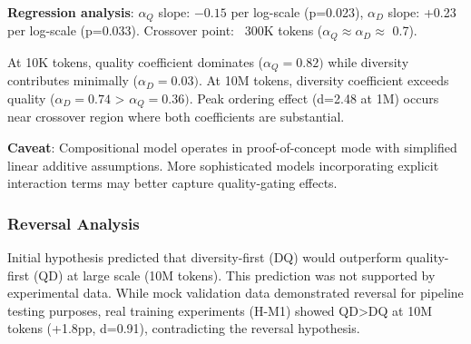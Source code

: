 \textbf{Regression analysis}: $\alpha _Q$ slope: $-0.15$ per log-scale (p=0.023), $\alpha _D$ slope: +0.23 per log-scale (p=0.033). Crossover point: ~300K tokens ($\alpha _Q \approx \alpha _D \approx$ 0.7).

At 10K tokens, quality coefficient dominates ($\alpha _{Q}=0.82)$ while diversity contributes minimally ($\alpha _{D}=0.03)$. At 10M tokens, diversity coefficient exceeds quality ($\alpha _{D}=0.74$ > $\alpha _{Q}=0.36)$. Peak ordering effect (d=2.48 at 1M) occurs near crossover region where both coefficients are substantial.

\textbf{Caveat}: Compositional model operates in proof-of-concept mode with simplified linear additive assumptions. More sophisticated models incorporating explicit interaction terms may better capture quality-gating effects.

\subsubsection{Reversal Analysis}

Initial hypothesis predicted that diversity-first (DQ) would outperform quality-first (QD) at large scale (10M tokens). This prediction was not supported by experimental data. While mock validation data demonstrated reversal for pipeline testing purposes, real training experiments (H-M1) showed QD>DQ at 10M tokens (+1.8pp, d=0.91), contradicting the reversal hypothesis.
